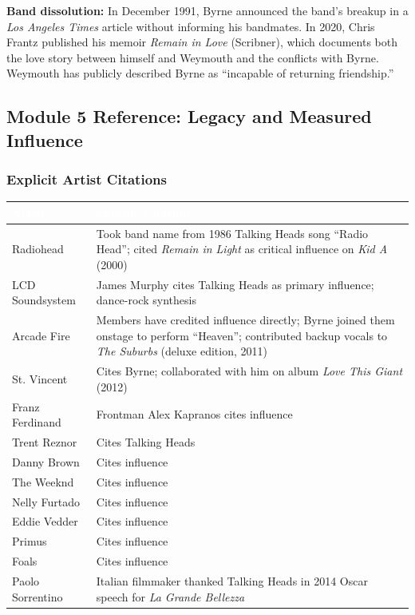 \documentclass[11pt,letterpaper]{article}
\newcommand{\tableheader}[1]{\textbf{\sffamily\textcolor{white}{#1}}}
\begin{document}
\textbf{Band dissolution:} In December 1991, Byrne announced the band's breakup in a \textit{Los Angeles Times} article without informing his bandmates. In 2020, Chris Frantz published his memoir \textit{Remain in Love} (Scribner), which documents both the love story between himself and Weymouth and the conflicts with Byrne. Weymouth has publicly described Byrne as ``incapable of returning friendship.''

\subsection{Module 5 Reference: Legacy and Measured Influence}

\subsubsection{Explicit Artist Citations}

\begin{center}
\begin{tabularx}{\textwidth}{L{3.5cm}X}
\toprule
{}
\tableheader{Artist} & \tableheader{Specific Citation} \\
\midrule
Radiohead & Took band name from 1986 Talking Heads song ``Radio Head''; cited \textit{Remain in Light} as critical influence on \textit{Kid A} (2000) \\
LCD Soundsystem & James Murphy cites Talking Heads as primary influence; dance-rock synthesis \\
Arcade Fire & Members have credited influence directly; Byrne joined them onstage to perform ``Heaven''; contributed backup vocals to \textit{The Suburbs} (deluxe edition, 2011) \\
St. Vincent & Cites Byrne; collaborated with him on album \textit{Love This Giant} (2012) \\
Franz Ferdinand & Frontman Alex Kapranos cites influence \\
Trent Reznor & Cites Talking Heads \\
Danny Brown & Cites influence \\
The Weeknd & Cites influence \\
Nelly Furtado & Cites influence \\
Eddie Vedder & Cites influence \\
Primus & Cites influence \\
Foals & Cites influence \\
Paolo Sorrentino & Italian filmmaker thanked Talking Heads in 2014 Oscar speech for \textit{La Grande Bellezza} \\
\bottomrule
\end{tabularx}
\end{center}
\end{document}
